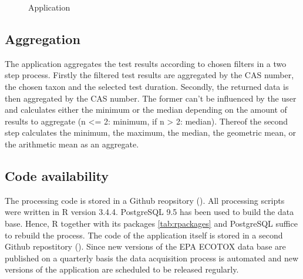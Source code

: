 \begin{figure}
    
    \caption{Application}
    \label{fig:app}
\end{figure}

\subsection*{Aggregation}
The \etoxbase{} application aggregates the test results according to chosen filters in a two step process. Firstly the filtered test results are aggregated by the CAS number, the chosen taxon and the selected test duration. Secondly, the returned data is then aggregated by the CAS number. The former can't be influenced by the user and calculates either the minimum or the median depending on the amount of results to aggregate (n <= 2: minimum, if n > 2: median). Thereof the second step calculates the minimum, the maximum, the median, the geometric mean, or the arithmetic mean as an aggregate. 

\subsection*{Code availability}

The processing code is stored in a Github reopsitory (\git{}). All processing scripts were written in R version 3.4.4. PostgreSQL 9.5 has been used to build the data base. Hence, R together with its packages \ref{tab:rpackages} and PostgreSQL suffice to rebuild the process. The code of the application itself is stored in a second Github repostitory (\gitapp{}). Since new versions of the EPA ECOTOX data base are published on a quarterly basis the data acquisition process is automated and new versions of the application are scheduled to be released regularly.

